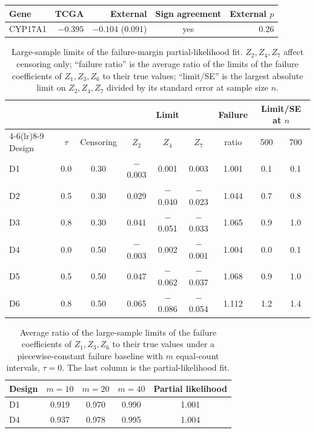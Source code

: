 \begin{table}[!htbp]
\centering

\label{tab:external-supp}
\small
\begin{tabular}{lrrcr}
\toprule
Gene & TCGA & External & Sign agreement & External $p$ \\
\midrule
CYP17A1 & $-0.395$ & $-0.104$ (0.091) & yes & 0.26 \\
\bottomrule
\end{tabular}
\end{table}

\begin{table}[!htbp]
\centering
\caption{Large-sample limits of the failure-margin partial-likelihood fit. \(Z_2,Z_4,Z_7\) affect censoring only; ``failure ratio'' is the average ratio of the limits of the failure coefficients of \(Z_1,Z_3,Z_6\) to their true values; ``limit/SE'' is the largest absolute limit on \(Z_2,Z_4,Z_7\) divided by its standard error at sample size \(n\).}
\label{tab:pl-limits}
\small
\begin{tabular}{lcccccccc}
\toprule
 & & & \multicolumn{3}{c}{Limit} & Failure & \multicolumn{2}{c}{Limit/SE at \(n\)}\\
\cmidrule(lr){4-6}\cmidrule(lr){8-9}
Design & \(\tau\) & Censoring & \(Z_2\) & \(Z_4\) & \(Z_7\) & ratio & 500 & 700\\
\midrule
D1 & 0.0 & 0.30 & $-$0.003 & 0.001 & 0.003 & 1.001 & 0.1 & 0.1 \\
D2 & 0.5 & 0.30 & 0.029 & $-$0.040 & $-$0.023 & 1.044 & 0.7 & 0.8 \\
D3 & 0.8 & 0.30 & 0.041 & $-$0.051 & $-$0.033 & 1.065 & 0.9 & 1.0 \\
D4 & 0.0 & 0.50 & $-$0.003 & 0.002 & $-$0.001 & 1.004 & 0.0 & 0.1 \\
D5 & 0.5 & 0.50 & 0.047 & $-$0.062 & $-$0.037 & 1.068 & 0.9 & 1.0 \\
D6 & 0.8 & 0.50 & 0.065 & $-$0.086 & $-$0.054 & 1.112 & 1.2 & 1.4 \\
\bottomrule
\end{tabular}
\end{table}

\begin{table}[!htbp]
\centering
\caption{Average ratio of the large-sample limits of the failure coefficients of \(Z_1,Z_3,Z_6\) to their true values under a piecewise-constant failure baseline with \(m\) equal-count intervals, \(\tau=0\). The last column is the partial-likelihood fit.}
\label{tab:baseline-sieve}
\small
\begin{tabular}{lcccc}
\toprule
Design & \(m=10\) & \(m=20\) & \(m=40\) & Partial likelihood\\
\midrule
D1 & 0.919 & 0.970 & 0.990 & 1.001 \\
D4 & 0.937 & 0.978 & 0.995 & 1.004 \\
\bottomrule
\end{tabular}
\end{table}

